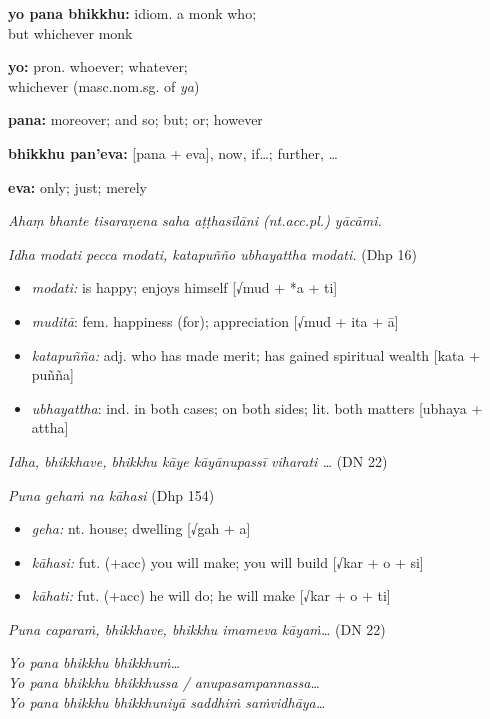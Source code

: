 \documentclass[11pt,oneside]{memoir}
\begin{document}
\begin{multicols}{2}

\textbf{yo pana bhikkhu:} idiom. a monk who;\\[0pt]
but whichever monk

\textbf{yo:} pron. whoever; whatever;\\[0pt]
whichever (masc.nom.sg. of \emph{ya})

\columnbreak

\textbf{pana:} moreover; and so; but; or; however

\textbf{bhikkhu pan'eva:} [pana + eva], now, if\ldots{}; further, \ldots{}

\textbf{eva:} only; just; merely

\end{multicols}

\emph{Ahaṃ bhante tisaraṇena saha aṭṭhasīlāni (nt.acc.pl.) yācāmi.}

\emph{Idha modati pecca modati, katapuñño ubhayattha modati.} (Dhp 16)

\begin{itemize}
\item \emph{modati:} is happy; enjoys himself [√mud + *a + ti]
\item \emph{muditā}: fem. happiness (for); appreciation [√mud + ita + ā]
\item \emph{katapuñña:} adj. who has made merit; has gained spiritual wealth [kata + puñña]
\item \emph{ubhayattha}: ind. in both cases; on both sides; lit. both matters [ubhaya + attha]
\end{itemize}

\emph{Idha, bhikkhave, bhikkhu kāye kāyānupassī viharati \ldots{}} (DN 22)

\emph{Puna gehaṁ na kāhasi} (Dhp 154)

\begin{itemize}
\item \emph{geha:} nt. house; dwelling [√gah + a]
\item \emph{kāhasi:} fut. (+acc) you will make; you will build [√kar + o + si]
\item \emph{kāhati:} fut. (+acc) he will do; he will make [√kar + o + ti]
\end{itemize}

\emph{Puna caparaṁ, bhikkhave, bhikkhu imameva kāyaṁ\ldots{}} (DN 22)

\emph{Yo pana bhikkhu bhikkhuṁ\ldots{}} \\[0pt]
\emph{Yo pana bhikkhu bhikkhussa / anupasampannassa\ldots{}} \\[0pt]
\emph{Yo pana bhikkhu bhikkhuniyā saddhiṁ saṁvidhāya\ldots{}}
\end{document}
